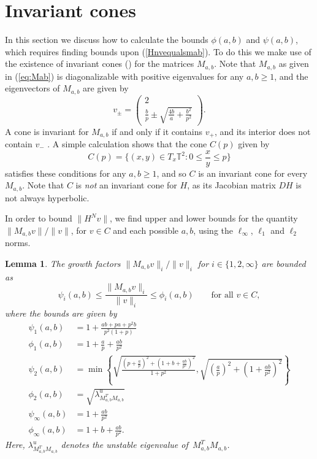 \documentclass{iopart}
\newtheorem{lemma}{Lemma}
\begin{document}
\section{Invariant cones}\label{sec:inv_cone}

In this section we discuss how to calculate the bounds $\phi (a,b)$ and $\psi (a,b)$, which requires finding bounds upon (\ref{Hnvequalsmab}). To do this we make use of the existence of invariant cones (\cite{alekseev1968quasirandom1,alekseev1968quasirandom2,alekseev1969quasirandom}) for the matrices $M_{a,b}$. Note that $M_{a,b}$ as given in (\ref{eq:Mab}) is diagonalizable with positive eigenvalues for any $a,b \ge 1$, and the eigenvectors of 
$M_{a,b}$ are given by
\begin{equation*}
v_\pm = \left( \begin{array}{c} 2 \\ \frac{b}{p} \pm \sqrt{\frac{4b}{a} 
+ \frac{b^2}{p^2}} \end{array} \right).
\end{equation*}
A cone is invariant for $M_{a,b}$ if and only if it  contains $v_+$, and its interior does not contain $v_-$ \cite{rodman2010common}. A simple calculation shows that the cone $C(p)$ given by
\begin{equation}
C(p) = \big\{ (x,y) \in T_x \mathbb{T}^2 : 0 \le \frac{x}{y} \le p \big\}
\end{equation}
satisfies these conditions for any $a, b \ge 1$, and so $C$ is an invariant cone for every $M_{a,b}$. Note that $C$ is {\it not} an invariant cone 
for $H$, as its Jacobian matrix $DH$ is not always hyperbolic.

In order to bound $\|H^N v\|$, we find upper and lower bounds for the quantity $\|M_{a , b} v\|/\|v\|$, for $v \in C$ and each possible $a,b$, using the $\ell_\infty$, $\ell_1$ and $\ell_2$ norms. 

\begin{lemma}
\label{lem:Mabbounds}
The growth factors $\|M_{a,b} v\|_i / \|v\|_i$ for $i \in \{1,2,\infty\}$ 
are bounded as
$$
\psi_i(a,b) \le \frac{\|M_{a,b}v\|_i}{\|v\|_i} \le \phi_i(a,b)
\qquad \text{for all $v \in C$},
$$
where the bounds are given by
\begin{align*}
	\psi_1(a,b) &=  1+ \frac{ab+pa+p^2 b}{p^2 (1+p)} \\
	\phi_1(a,b) &=  1+ \frac{a}{p} + \frac{ab}{p^2} \\
	\psi_2(a,b) &=  \min \left\{ \sqrt{\frac{(p+\frac{a}{p})^2 + (1+b+\frac{ab}{p^2})^2}{1+p^2}}, \sqrt{(\frac{a}{p})^2 + (1+\frac{ab}{p^2})^2} \right\} \\
	\phi_2(a,b) &=  \sqrt{\lambda_{M_{a,b}^T M_{a,b}}^{u}} \\
	\psi_{\infty}(a,b) &=  1 + \frac{ab}{p^2} \\
	\phi_{\infty}(a,b) &=  1 + b + \frac{ab}{p^2}. 
\end{align*}
Here, $\lambda_{M_{a,b}^T M_{a,b}}^{u}$ denotes the unstable eigenvalue of~$M_{a,b}^T M_{a,b}$.
\end{lemma}
\end{document}
